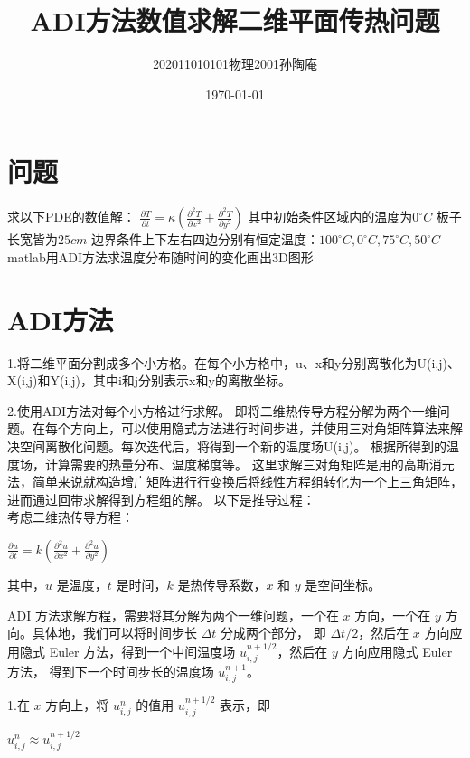 \documentclass[12pt, a4paper, oneside]{ctexart}
\title{ADI方法数值求解二维平面传热问题}
\date{\today}
\author{202011010101物理2001孙陶庵}
\begin{document}
\begin{spacing}{2.0}
\tableofcontents
\maketitle

\section{问题}
求以下PDE的数值解：
$\displaystyle \frac{\partial T}{\partial t} = \kappa (\frac{\partial^2 T}{\partial x^2} + \frac{\partial^2 T}{\partial y^2})$
其中初始条件区域内的温度为$0^{\circ}C$
板子长宽皆为$25cm$
边界条件上下左右四边分别有恒定温度：$100^{\circ}C, 0^{\circ}C, 75^{\circ}C, 50^{\circ}C$
matlab用ADI方法求温度分布随时间的变化画出3D图形


\section{ADI方法}
1.将二维平面分割成多个小方格。在每个小方格中，u、x和y分别离散化为U(i,j)、X(i,j)和Y(i,j)，其中i和j分别表示x和y的离散坐标。

2.使用ADI方法对每个小方格进行求解。
即将二维热传导方程分解为两个一维问题。在每个方向上，可以使用隐式方法进行时间步进，并使用三对角矩阵算法来解决空间离散化问题。每次迭代后，将得到一个新的温度场U(i,j)。
根据所得到的温度场，计算需要的热量分布、温度梯度等。
这里求解三对角矩阵是用的高斯消元法，简单来说就构造增广矩阵进行行变换后将线性方程组转化为一个上三角矩阵，进而通过回带求解得到方程组的解。
以下是推导过程：\\
考虑二维热传导方程：

\begin{center}
    $\displaystyle \frac{\partial u}{\partial t} = k\left(\frac{\partial^2 u}{\partial x^2} + \frac{\partial^2 u}{\partial y^2}\right)$
\end{center}

其中，$u$ 是温度，$t$ 是时间，$k$ 是热传导系数，$x$ 和 $y$ 是空间坐标。

ADI 方法求解方程，需要将其分解为两个一维问题，一个在 $x$ 方向，一个在 $y$ 方向。具体地，我们可以将时间步长 $\Delta t$ 分成两个部分，
即 $\Delta t/2$，然后在 $x$ 方向应用隐式 Euler 方法，得到一个中间温度场 $u^{n+1/2}_{i,j}$，然后在 $y$ 方向应用隐式 Euler 方法，
得到下一个时间步长的温度场 $u^{n+1}_{i,j}$。

1.在 $x$ 方向上，将 $u^{n}_{i,j}$ 的值用 $u^{n+1/2}_{i,j}$ 表示，即
\begin{center}
    $\displaystyle u^{n}_{i,j} \approx u^{n+1/2}_{i,j}$
\end{center}


\end{spacing}
\end{document}
